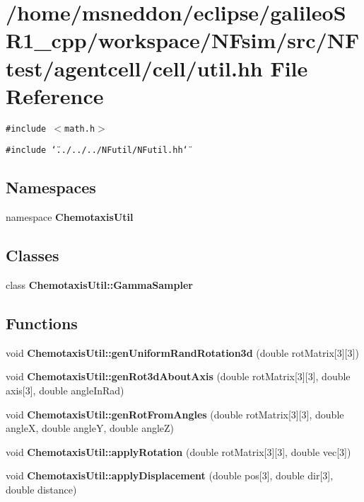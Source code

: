 \section{/home/msneddon/eclipse/galileoSR1\_\-cpp/workspace/NFsim/src/NFtest/agentcell/cell/util.hh File Reference}
\label{util_8hh}


{\tt \#include $<$math.h$>$}\par
{\tt \#include \char`\"{}../../../NFutil/NFutil.hh\char`\"{}}\par
\subsection*{Namespaces}
\begin{CompactItemize}
\item 
namespace {\bf ChemotaxisUtil}
\end{CompactItemize}
\subsection*{Classes}
\begin{CompactItemize}
\item 
class {\bf ChemotaxisUtil::GammaSampler}
\end{CompactItemize}
\subsection*{Functions}
\begin{CompactItemize}
\item 
void {\bf ChemotaxisUtil::genUniformRandRotation3d} (double rotMatrix[3][3])
\item 
void {\bf ChemotaxisUtil::genRot3dAboutAxis} (double rotMatrix[3][3], double axis[3], double angleInRad)
\item 
void {\bf ChemotaxisUtil::genRotFromAngles} (double rotMatrix[3][3], double angleX, double angleY, double angleZ)
\item 
void {\bf ChemotaxisUtil::applyRotation} (double rotMatrix[3][3], double vec[3])
\item 
void {\bf ChemotaxisUtil::applyDisplacement} (double pos[3], double dir[3], double distance)
\end{CompactItemize}
